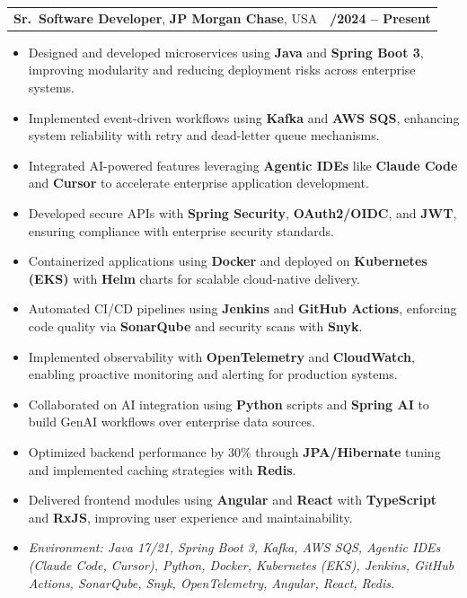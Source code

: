 \documentclass[letterpaper,11pt]{article}
\makeatletter
\newcommand{\resumeItem}[1]{
  \item\footnotesize{
    {#1 \vspace{-2pt}}
  }
}
\newcommand{\resumeSubheading}[4]{
  \vspace{-2pt}\item
    \begin{tabular*}{1.0\textwidth}[t]{l@{\extracolsep{\fill}}r}
      \textbf{\fontsize{10pt}{14pt}\selectfont #3}, \textbf{\fontsize{10pt}{14pt}\selectfont #1}, \fontsize{10pt}{14pt}\selectfont #4 & \textbf{\fontsize{10pt}{14pt}\selectfont #2} \\
    \end{tabular*}\vspace{-7pt}
}
\newcommand{\resumeItemListStart}{\begin{itemize}[leftmargin=*]}
\newcommand{\resumeItemListEnd}{\end{itemize}\vspace{-5pt}}
\makeatother
\begin{document}
\resumeSubheading
{JP Morgan Chase}{09/2024 -- Present}
{Sr.\ Software Developer}{USA}
\resumeItemListStart
  \resumeItem{Designed and developed microservices using \textbf{Java} and \textbf{Spring Boot 3}, improving modularity and reducing deployment risks across enterprise systems.}
  \resumeItem{Implemented event-driven workflows using \textbf{Kafka} and \textbf{AWS SQS}, enhancing system reliability with retry and dead-letter queue mechanisms.}
  \resumeItem{Integrated AI-powered features leveraging \textbf{Agentic IDEs} like \textbf{Claude Code} and \textbf{Cursor} to accelerate enterprise application development.}
  \resumeItem{Developed secure APIs with \textbf{Spring Security}, \textbf{OAuth2/OIDC}, and \textbf{JWT}, ensuring compliance with enterprise security standards.}
  \resumeItem{Containerized applications using \textbf{Docker} and deployed on \textbf{Kubernetes (EKS)} with \textbf{Helm} charts for scalable cloud-native delivery.}
  \resumeItem{Automated CI/CD pipelines using \textbf{Jenkins} and \textbf{GitHub Actions}, enforcing code quality via \textbf{SonarQube} and security scans with \textbf{Snyk}.}
  \resumeItem{Implemented observability with \textbf{OpenTelemetry} and \textbf{CloudWatch}, enabling proactive monitoring and alerting for production systems.}
  \resumeItem{Collaborated on AI integration using \textbf{Python} scripts and \textbf{Spring AI} to build GenAI workflows over enterprise data sources.}
  \resumeItem{Optimized backend performance by 30\% through \textbf{JPA/Hibernate} tuning and implemented caching strategies with \textbf{Redis}.}
  \resumeItem{Delivered frontend modules using \textbf{Angular} and \textbf{React} with \textbf{TypeScript} and \textbf{RxJS}, improving user experience and maintainability.}
  \resumeItem{\textit{Environment: Java 17/21, Spring Boot 3, Kafka, AWS SQS, Agentic IDEs (Claude Code, Cursor), Python, Docker, Kubernetes (EKS), Jenkins, GitHub Actions, SonarQube, Snyk, OpenTelemetry, Angular, React, Redis.}}
\resumeItemListEnd
\end{document}
